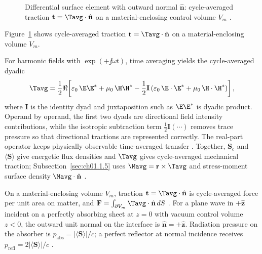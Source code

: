\begin{figure}[t]
\centering
\VolIPhysFig{\VolIPhysStressTraction}
\caption{Differential surface element with outward normal $\hat{\mathbf{n}}$: cycle-averaged traction $\mathbf{t}=\Tavg\cdot\hat{\mathbf{n}}$ on a material-enclosing control volume $V_m$ \cite{maxwell1873,stratton1941}.}
\label{fig:ch1.stress-traction-element}
\end{figure}

Figure~\ref{fig:ch1.stress-traction-element} shows cycle-averaged traction $\mathbf{t}=\Tavg\cdot\hat{\mathbf{n}}$ on a material-enclosing volume $V_m$.

For harmonic fields with $\exp(+\jj\omega t)$, time averaging yields the cycle-averaged dyadic
\begin{equation}
\label{eq:ch1.maxwell-stress}
\Tavg
=\frac{1}{2}\Re\!\left[
\varepsilon_0\,\E\E^*
+\mu_0\,\H\H^*
-\frac{1}{2}\mathbf{I}
\left(\varepsilon_0\,\E\cdot\E^*+\mu_0\,\H\cdot\H^*\right)
\right],
\end{equation}
where \(\mathbf{I}\) is the identity dyad and juxtaposition such as \(\E\E^*\)
is dyadic product. Operand by operand, the first two dyads are directional field
intensity contributions, while the isotropic subtraction term
\(\tfrac{1}{2}\mathbf{I}(\cdots)\) removes trace pressure so that directional
tractions are represented correctly. The real-part operator keeps physically
observable time-averaged transfer \cite{stratton1941}.
Together, $\mathbf{S}_\mathrm{c}$ and $\langle\mathbf{S}\rangle$ give energetic flux densities and $\Tavg$ gives cycle-averaged mechanical traction; Subsection~\ref{sec:ch01.1.5} uses $\Mavg=\mathbf{r}\times\Tavg$ and stress-moment surface density $\Mavg\cdot\hat{\mathbf{n}}$ \cite{poynting1884}.

On a material-enclosing volume $V_m$, traction $\mathbf{t}=\Tavg\cdot\hat{\mathbf{n}}$ is cycle-averaged force per unit area on matter, and $\mathbf{F}=\int_{\partial V_m}\Tavg\cdot\hat{\mathbf{n}}\,dS$ \cite{stratton1941}.
For a plane wave in $+\hat{\mathbf{z}}$ incident on a perfectly absorbing sheet at
$z=0$ with vacuum control volume $z<0$, the outward unit normal on the interface is
$\hat{\mathbf{n}}=+\hat{\mathbf{z}}$. Radiation pressure on the absorber is
$p_{\mathrm{abs}}=|\langle\mathbf{S}\rangle|/c$; a perfect reflector at normal incidence receives
$p_{\mathrm{refl}}=2|\langle\mathbf{S}\rangle|/c$ \cite{stratton1941,maxwell1873}.

